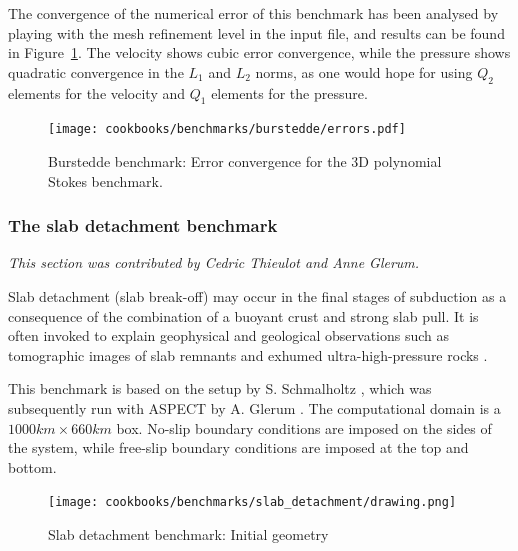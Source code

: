 \documentclass{article}
\newcommand{\aspect}{\textsc{ASPECT}}
\begin{document}
The convergence of the numerical error of this benchmark has been analysed by
playing with the mesh refinement level in the input file, and
results can be found in Figure~\ref{errors}. The velocity shows cubic error
convergence, while the pressure shows quadratic convergence in the $L_1$ and
$L_2$ norms, as one would hope for using $Q_2$ elements for the velocity and
$Q_1$ elements for the pressure.

\begin{figure}[tbp]
  \centering
  \texttt{[image: cookbooks/benchmarks/burstedde/errors.pdf]}
  \caption{Burstedde benchmark: Error convergence for the 3D polynomial Stokes
    benchmark.
    \label{errors}}
\end{figure}

\subsubsection{The slab detachment benchmark}
\label{sec:benchmark_slab_detachment}

\textit{This section was contributed by Cedric Thieulot and Anne Glerum.}

Slab detachment (slab break-off) may occur in the final stages of subduction
as a consequence of the combination of a buoyant crust and strong slab pull.
It is often invoked to explain 
geophysical and geological observations such as 
tomographic images of slab remnants and
exhumed ultra-high-pressure rocks \cite{wosp00,vaal11,garm18}.

This benchmark is based on the setup by S. Schmalholtz \cite{schm11}, which was subsequently 
run with \aspect{} by A. Glerum \cite{gltf18}.
The computational domain is a $1000 \si{km}\times 660 \si{km}$ box.
No-slip boundary conditions are imposed on the sides of the system, while free-slip
boundary conditions are imposed at the top and bottom.

\begin{figure}
\centering
\texttt{[image: cookbooks/benchmarks/slab\_detachment/drawing.png]}
\caption{Slab detachment benchmark: Initial geometry 
\label{fig:slab_detachment_setup}}
\end{figure}
\end{document}
